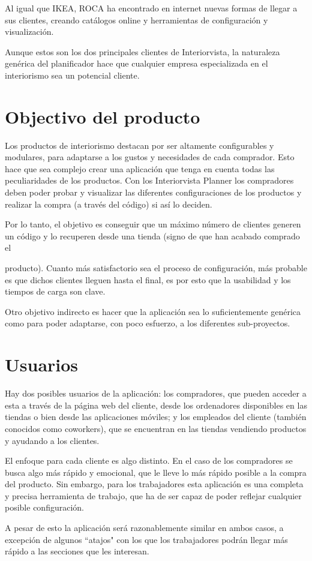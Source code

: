 Al igual que IKEA, ROCA ha encontrado en internet nuevas formas de llegar a sus clientes, creando catálogos online y herramientas de configuración y visualización.

Aunque estos son los dos principales clientes de Interiorvista, la naturaleza genérica del planificador hace que cualquier empresa especializada en el interiorismo sea un potencial cliente.

\section{Objectivo del producto}
Los productos de interiorismo destacan por ser altamente configurables y modulares, para adaptarse a los gustos y necesidades de cada comprador. Esto hace que sea complejo crear una aplicación que tenga en cuenta todas las peculiaridades de los productos. Con los Interiorvista Planner los compradores deben poder probar y visualizar las diferentes configuraciones de los productos y realizar la compra (a través del código) si así lo deciden.

Por lo tanto, el objetivo es conseguir que un máximo número de clientes generen un código y lo recuperen desde una tienda (signo de que han acabado comprado el

producto). Cuanto más satisfactorio sea el proceso de configuración, más probable es que dichos clientes lleguen hasta el final, es por esto que la usabilidad y los tiempos de carga son clave.

Otro objetivo indirecto es hacer que la aplicación sea lo suficientemente genérica como para poder adaptarse, con poco esfuerzo, a los diferentes sub-proyectos.

\section{Usuarios}
Hay dos posibles usuarios de la aplicación: los compradores, que pueden acceder a esta a través de la página web del cliente, desde los ordenadores disponibles en las tiendas o bien desde las aplicaciones móviles; y los empleados del cliente (también conocidos como coworkers), que se encuentran en las tiendas vendiendo productos y ayudando a los clientes.

El enfoque para cada cliente es algo distinto. En el caso de los compradores se busca algo más rápido y emocional, que le lleve lo más rápido posible a la compra del producto. Sin embargo, para los trabajadores esta aplicación es una completa y precisa herramienta de trabajo, que ha de ser capaz de poder reflejar cualquier posible configuración.

A pesar de esto la aplicación será razonablemente similar en ambos casos, a excepción de algunos ``atajos" con los que los trabajadores podrán llegar más rápido a las secciones que les interesan.

